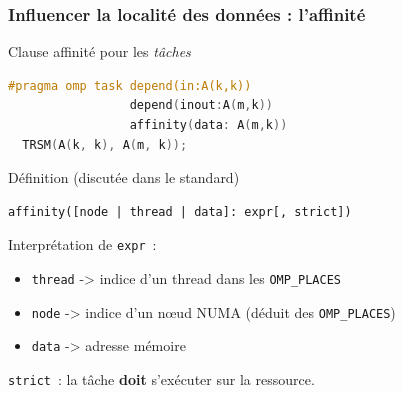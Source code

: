 \documentclass[xcolor={usenames,dvipsnames,svgnames,table}, aspectratio=43]{beamer}
\begin{document}
\begin{frame}[fragile]
\frametitle{Influencer la localité des données : l'affinité}

\begin{block}{Clause affinité pour les \textit{tâches}}
  \begin{lstlisting}[language=c, numbers=none, basicstyle=\scriptsize]
#pragma omp task depend(in:A(k,k))
                 depend(inout:A(m,k))
                 affinity(data: A(m,k))
  TRSM(A(k, k), A(m, k));
  \end{lstlisting}
\end{block}


\begin{block}{Définition (discutée dans le standard)}
  \begin{lstlisting}[numbers=none, basicstyle=\scriptsize]
  affinity([node | thread | data]: expr[, strict])
  \end{lstlisting}
  Interprétation de \texttt{expr}~:
  \begin{itemize}
    \item \texttt{thread} -> indice d'un thread dans les \verb/OMP_PLACES/
    \item \texttt{node} -> indice d'un nœud NUMA (déduit des \verb/OMP_PLACES/)
    \item \texttt{data} -> adresse mémoire
  \end{itemize}
  \texttt{strict}~: la tâche \textbf{doit} s'exécuter sur la ressource.
\end{block}


\end{frame}
\end{document}

